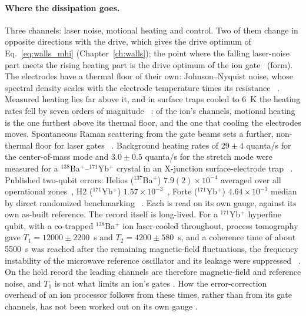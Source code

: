 \paragraph{Where the dissipation goes.} Three channels: laser noise, motional heating and control. Two of them
change in opposite directions with the drive, which gives the drive optimum of Eq.~\eqref{eq:walls_mhi} (Chapter~\ref{ch:walls}); the point
where the falling laser-noise part meets the rising heating part is the drive optimum of the ion gate \conjecture\ (form).
The electrodes have a thermal floor of their own: Johnson--Nyquist noise, whose spectral density scales with the electrode temperature
times its resistance~\cite{Brownnutt2015} \derived. Measured heating lies far above it, and in surface traps cooled to 6~K the heating
rates fell by seven orders of magnitude~\cite{Labaziewicz2008} \observed: of the ion's channels, motional heating is the one furthest above
its thermal floor, and the one that cooling the electrodes moves. Spontaneous Raman scattering from the gate beams sets a further,
non-thermal floor for laser gates~\cite{Ozeri2007} \observed. Background heating rates of $29\pm4$ quanta/s for the center-of-mass mode and
$3.0\pm0.5$ quanta/s for the stretch mode were measured for a $^{138}$Ba$^+$--$^{171}$Yb$^+$ crystal in an X-junction surface-electrode
trap~\cite{Burton2023} \observed. Published two-qubit errors: Helios ($^{137}$Ba$^+$) $7.9(2)\times10^{-4}$ averaged over all operational
zones~\cite{Ransford2025}, H2 ($^{171}$Yb$^+$) $1.57\times10^{-3}$~\cite{DeCross2025}, Forte ($^{171}$Yb$^+$) $4.64\times10^{-3}$ median by direct
randomized benchmarking~\cite{Chen2024Forte} \observed. Each is read on its own gauge, against its own as-built reference. The record itself is long-lived. For a $^{171}$Yb$^+$ hyperfine qubit, with a co-trapped $^{138}$Ba$^+$ ion laser-cooled throughout,
process tomography gave $T_1=12000\pm2200$~s and $T_2=4200\pm580$~s, and a coherence time of about 5500~s was reached after the
remaining magnetic-field fluctuations, the frequency instability of the microwave reference oscillator and its leakage were
suppressed~\cite{WangYb2021} \observed. On the held record the leading channels are therefore magnetic-field and reference noise, and
$T_1$ is not what limits an ion's gates \interp. How the error-correction overhead of an ion processor follows from these times, rather
than from its gate channels, has not been worked out on its own gauge \openprob.

